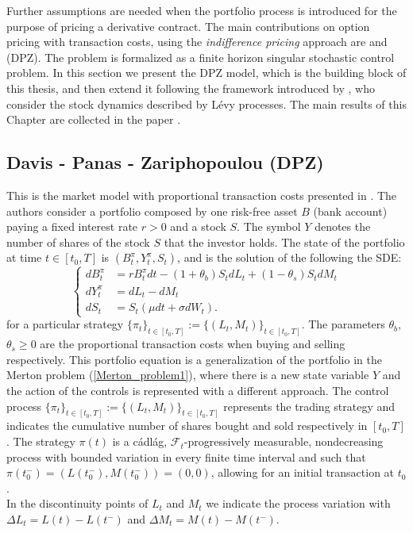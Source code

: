 Further assumptions are needed when the portfolio process is introduced for the purpose of pricing a derivative contract.
The main contributions on option pricing with transaction costs, using the \emph{indifference pricing} approach are
\cite{HoNe89} and \cite{DaPaZa93} (DPZ). The problem is formalized as a finite horizon singular stochastic control problem.
In this section we present the DPZ model, which is the building block of this thesis, and then extend it following the framework introduced by \cite{Kab16}, 
who consider the stock dynamics described by Lévy processes.
The main results of this Chapter are collected in the paper \cite{Canta}.


\subsection{Davis - Panas - Zariphopoulou (DPZ)}\label{DPZ_sec}

This is the market model with proportional transaction costs presented in \cite{DaPaZa93}. 
The authors consider a portfolio composed by one risk-free asset $B$ (bank account) paying a fixed interest rate $r > 0$ and a stock $S$. 
The symbol $Y$ denotes the number of shares of the stock $S$ that the investor holds. 
The state of the portfolio at time $t\in [t_0,T]$ is $(B^{\pi}_t,Y^{\pi}_t,S_t)$, and is the solution of the following the SDE:
\begin{equation}\label{DPZ_porfolio_dynamics}
 \begin{cases}
 dB^{\pi}_t &=  rB^{\pi}_t dt - (1+\theta_b)S_t dL_t + (1-\theta_s) S_t dM_t \\
 dY^{\pi}_t &=  dL_t - dM_t \\
 dS_t &=  S_t \left( \mu dt + \sigma dW_t \right).
\end{cases}
\end{equation} 
for a particular strategy $\{\pi_t\}_{t \in [t_0,T]} := \{(L_t,M_t)\}_{t \in [t_0,T]}$.
The parameters $\theta_b$, $\theta_s \geq 0$ are the proportional transaction costs when buying and selling respectively.
This portfolio equation is a generalization of the portfolio in the Merton problem (\ref{Merton_problem1}), 
where there is a new state variable $Y$ and the action of the controls is represented with a different approach.
The control process $\{\pi_t\}_{t \in [t_0,T]} := \{(L_t,M_t)\}_{t \in [t_0,T]}$ represents the trading strategy and indicates the 
cumulative number of shares bought and sold respectively in $[t_0,T]$.
The strategy $\pi(t)$ is a cádlág, $\mathcal{F}_t$-progressively measurable, nondecreasing process with bounded variation in every finite time interval and such that
$ \pi(t_0^-) = ( L(t_0^-) , M(t_0^-) ) = (0,0) $, allowing for an initial transaction at $t_0$.\\
In the discontinuity points of $L_t$ and $M_t$ we indicate the process variation with $\Delta L_t= L(t)-L(t^-)$ and $\Delta M_t= M(t)-M(t^-)$.

